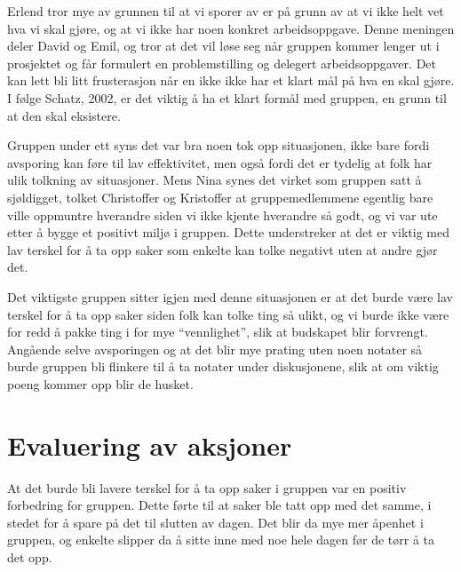 Erlend tror mye av grunnen til at vi sporer av er på grunn av at vi ikke helt vet hva vi skal gjøre, og at vi ikke har noen konkret 
arbeidsoppgave. Denne meningen deler David og Emil, og tror at det vil løse seg når gruppen kommer lenger ut i prosjektet og får 
formulert en problemstilling og delegert arbeidsoppgaver. Det kan lett bli litt frusterasjon når en ikke ikke har et klart mål på hva en 
skal gjøre. I følge Schatz, 2002, er det viktig å ha et klart formål med gruppen, en grunn til at den skal eksistere.

Gruppen under ett syns det var bra noen tok opp situasjonen, ikke bare fordi avsporing kan føre til lav effektivitet, men også fordi det 
er tydelig at folk har ulik tolkning av situasjoner. Mens Nina synes det virket som gruppen satt å sjøldigget, tolket Christoffer og 
Kristoffer at gruppemedlemmene egentlig bare ville oppmuntre hverandre siden vi ikke kjente hverandre så godt, og vi var ute etter å 
bygge et positivt miljø i gruppen. Dette understreker at det er viktig med lav terskel for å ta opp saker som enkelte kan tolke negativt 
uten at andre gjør det.

Det viktigste gruppen sitter igjen med denne situasjonen er at det burde være lav terskel for å ta opp saker siden folk kan tolke ting så 
ulikt, og vi burde ikke være for redd å pakke ting i for mye “vennlighet”, slik at budskapet blir forvrengt. Angående selve avsporingen 
og at det blir mye prating uten noen notater så burde gruppen bli flinkere til å ta notater under diskusjonene, slik at om viktig poeng 
kommer opp blir de husket.

\section{Evaluering av aksjoner}
At det burde bli lavere terskel for å ta opp saker i gruppen var en positiv forbedring for gruppen. Dette førte til at saker ble tatt opp 
med det samme, i stedet for å spare på det til slutten av dagen. Det blir da mye mer åpenhet i gruppen, og enkelte slipper da å sitte 
inne med noe hele dagen før de tørr å ta det opp.

